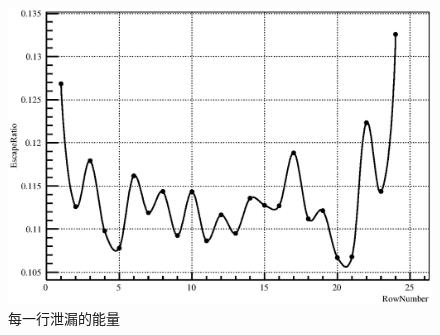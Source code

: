 \documentclass{beamer}
\newcommand{\yihao}{\fontsize{30pt}{\baselineskip}\selectfont}
\newcommand{\qihao}{\fontsize{5.25pt}{\baselineskip}\selectfont}
\newcommand{\ThankYouPage}{
  \begin{frame}
    \yihao \centering \textcolor{blue}
    {Thank You!}
  \end{frame}
}
\begin{document}
\begin{CJK*}{UTF8}{gkai}
\begin{frame}
\begin{figure}[ht]
      \includegraphics[width=\textwidth]{EscapeRatioNhits1.eps}
      \caption{\qihao 每一行泄漏的能量}
    \end{figure}
  \end{frame}
\end{CJK*}
\end{document}

